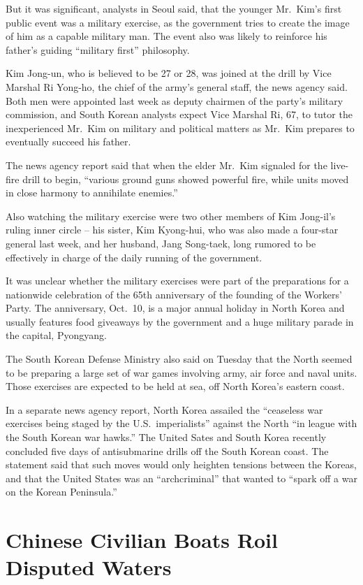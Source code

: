 ﻿\documentclass[12pt]{article}
\begin{document}
But it was significant, analysts in Seoul said, that the younger Mr.~Kim's first public event was a
military exercise, as the government tries to create the image of him as a capable military man. The
event also was likely to reinforce his father's guiding ``military first'' philosophy.

Kim Jong-un, who is believed to be 27 or 28, was joined at the drill by Vice Marshal Ri Yong-ho, the
chief of the army's general staff, the news agency said. Both men were appointed last week as deputy
chairmen of the party's military commission, and South Korean analysts expect Vice Marshal Ri, 67,
to tutor the inexperienced Mr.~Kim on military and political matters as Mr.~Kim prepares to
eventually succeed his father.

The news agency report said that when the elder Mr.~Kim signaled for the live-fire drill to begin,
``various ground guns showed powerful fire, while units moved in close harmony to annihilate
enemies.''

Also watching the military exercise were two other members of Kim Jong-il's ruling inner circle --
his sister, Kim Kyong-hui, who was also made a four-star general last week, and her husband, Jang
Song-taek, long rumored to be effectively in charge of the daily running of the government.

It was unclear whether the military exercises were part of the preparations for a nationwide
celebration of the 65th anniversary of the founding of the Workers' Party. The anniversary, Oct.~10,
is a major annual holiday in North Korea and usually features food giveaways by the government and a
huge military parade in the capital, Pyongyang.

The South Korean Defense Ministry also said on Tuesday that the North seemed to be preparing a large
set of war games involving army, air force and naval units. Those exercises are expected to be held
at sea, off North Korea's eastern coast.

In a separate news agency report, North Korea assailed the ``ceaseless war exercises being staged by
the U.S.~imperialists'' against the North ``in league with the South Korean war hawks.'' The United
Sates and South Korea recently concluded five days of antisubmarine drills off the South Korean
coast. The statement said that such moves would only heighten tensions between the Koreas, and that
the United States was an ``archcriminal'' that wanted to ``spark off a war on the Korean
Peninsula.''

\section{Chinese Civilian Boats Roil Disputed Waters}
\end{document}
